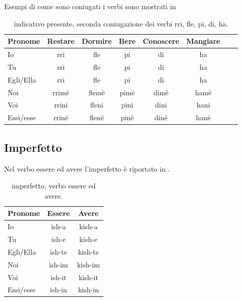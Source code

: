 Esempi di come sono coniugati i verbi sono mostrati in 

\begin{table}[H]
    \centering
    \begin{tabular}{lccccccc}
        \toprule
        Pronome     &   Restare  & Dormire   & Bere    & Conoscere   & Mangiare \\
        \midrule
        Io          &   rri     & fle      & pi       & di      & ha\\
        Tu          &   rri     & fle      & pi       & di      & ha\\
        Egli/Ella   &   rri     & fle      & pi       & di      & ha \\
        Noi         &   rrimë   & flemë    & pimë     & dimë    & hamë \\
        Voi         &   rrini   & fleni    & pini     & dini    & hani \\
        Essi/esse   &   rrinë   & flenë    & pinë     & dinë    & hanë\\
        \bottomrule
    \end{tabular}
    \caption{indicativo presente, seconda coniugazione dei verbi rri, fle, pi, di, ha.}
    \label{tbl:verb:terzaconiugazione:indicativo:presente}
\end{table}

\subsection{Imperfetto}

Nel verbo essere ed avere l'imperfetto è riportato in \cite{studylib:imperfetto}.

\begin{table}[H]
    \centering
    \begin{tabular}{lcc}
        \toprule
        Pronome     &   Essere & Avere \\
        \midrule
        Io          &   ish-a & kish-a \\
        Tu          &   ish-e & kish-e \\
        Egli/Ella   &   ish-te & kish-te \\
        Noi         &   ish-im & kish-im \\
        Voi         &   ish-it & kish-it \\
        Essi/esse   &   ish-in & kish-in \\
        \bottomrule
    \end{tabular}
    \caption{imperfetto, verbo essere ed avere.}
    \label{tbl:verb:imperfettto:essereavere}
\end{table}


